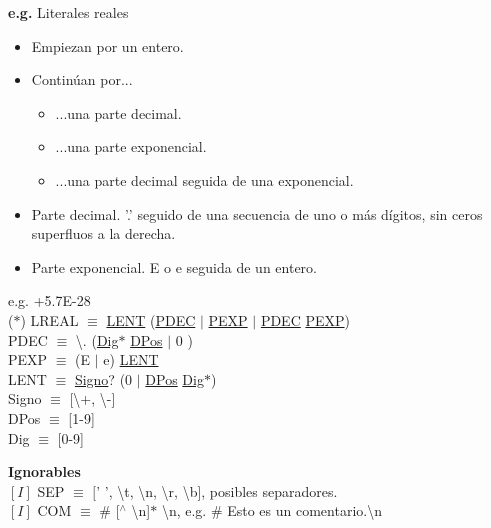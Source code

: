 \documentclass[\main/Apuntes_PL.tex]{subfiles}
\begin{document}
      \bigskip
      \par
      \textbf{e.g.} Literales reales
      \begin{itemize}
        \item Empiezan por un entero.
        \item Continúan por...
              \begin{itemize}
                \item ...una parte decimal.
                \item ...una parte exponencial.
                \item ...una parte decimal seguida de una exponencial.
              \end{itemize}
        \item Parte decimal. '.' seguido de una secuencia de uno o más dígitos, sin ceros superfluos a la derecha.
        \item Parte exponencial. E o e seguida de un entero.
      \end{itemize}
      \hspace{10mm}e.g. +5.7E-28\\
      \bigskip
      \hspace{5mm}($\ast$) LREAL $\equiv$ \underline{LENT} (\underline{PDEC} $\mid$ \underline{PEXP} $\mid$ \underline{PDEC} \underline{PEXP}) \\
      \hspace{10mm} PDEC $\equiv$ \textbackslash. (\underline{Dig}$\ast$ \underline{DPos} $\mid$ 0 ) \\
      \hspace{10mm} PEXP $\equiv$ (E $\mid$ e) \underline{LENT} \\
      \vspace{2mm}
      \hspace{10mm} LENT $\equiv$ \underline{Signo}? (0 $\mid$ \underline{DPos} \underline{Dig}$\ast$) \\
      \hspace{10mm} Signo $\equiv$ [\textbackslash+, \textbackslash-] \\
      \hspace{10mm} DPos  $\equiv$ [1-9] \\
      \hspace{10mm} Dig   $\equiv$ [0-9]

      \newpage
      \par
      \textbf{\large Ignorables} \\
      \hspace{3mm}$[I]$ SEP $\equiv$ $[$' ', \textbackslash t, \textbackslash n, \textbackslash r, \textbackslash b], posibles separadores. \\
      \hspace{3mm}$[I]$ COM $\equiv$ \# [$^\wedge$ \textbackslash n]$\ast$ \textbackslash n, e.g. \# Esto es un comentario.\textbackslash n
\end{document}
